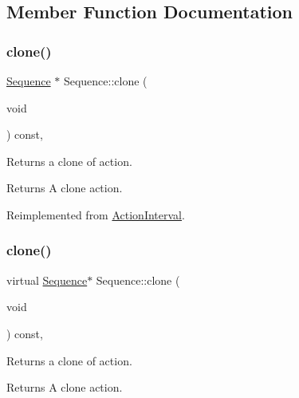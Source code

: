 \subsection{Member Function Documentation}
\mbox{\label{classSequence_ad6a4cd778ab275e08dfd945efd5a736f}} 
\subsubsection{\texorpdfstring{clone()}{clone()}\hspace{0.1cm}{\footnotesize\ttfamily [1/2]}}
{\footnotesize\ttfamily \hyperlink{classSequence}{Sequence} $\ast$ Sequence\+::clone (\begin{DoxyParamCaption}\item[{void}]{ }\end{DoxyParamCaption}) const\hspace{0.3cm}{\ttfamily [override]}, {\ttfamily [virtual]}}

Returns a clone of action.

\begin{DoxyReturn}{Returns}
A clone action. 
\end{DoxyReturn}


Reimplemented from \hyperlink{classActionInterval_abc93ce0c2f54a90eb216a7803f25f44a}{Action\+Interval}.

\mbox{\label{classSequence_af7a34db8abb86fa6c677e5fa7540f991}} 
\subsubsection{\texorpdfstring{clone()}{clone()}\hspace{0.1cm}{\footnotesize\ttfamily [2/2]}}
{\footnotesize\ttfamily virtual \hyperlink{classSequence}{Sequence}$\ast$ Sequence\+::clone (\begin{DoxyParamCaption}\item[{void}]{ }\end{DoxyParamCaption}) const\hspace{0.3cm}{\ttfamily [override]}, {\ttfamily [virtual]}}

Returns a clone of action.

\begin{DoxyReturn}{Returns}
A clone action. 
\end{DoxyReturn}


